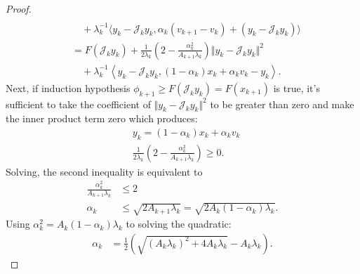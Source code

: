 \documentclass[12pt]{article}
\begin{document}
\begin{proof}
\begin{align*}
                \\
                    &\quad 
                    + 
                    \lambda_k^{-1}
                    \langle
                        y_k - \mathcal J_k y_k,
                        \alpha_k(v_{k + 1} - v_k) + (y_k - \mathcal J_k y_k)
                    \rangle
                \\
                &= 
                F(\mathcal J_k y_k)
                + 
                \frac{1}{2\lambda_k}
                \left(
                    2 - \frac{\alpha_k^2}{A_{k + 1}\lambda_k}
                \right)
                \Vert y_k - \mathcal J_ky_k\Vert^2
                \\
                    & \quad 
                    + 
                    \lambda_k^{-1}
                    \left\langle 
                        y_k - \mathcal J_k y_k, 
                        (1 - \alpha_k)x_k + \alpha_k v_k - y_k
                    \right\rangle. 
            \end{align*}
            Next, if induction hypothesis $\phi_{k + 1}\ge F(\mathcal J_k y_k) = F(x_{k + 1})$ is true, it's sufficient to take the coefficient of $\Vert y_k - \mathcal J_k y_k\Vert^2$ to be greater than zero and make the inner product term zero which produces: 
            \begin{align*}
                & 
                y_k = (1 - \alpha_k)x_k + \alpha_k v_k
                \\
                &
                \frac{1}{2\lambda_k}
                \left(
                    2 - \frac{\alpha_k^2}{A_{k + 1}\lambda_k}
                \right) 
                \ge 0.
            \end{align*}
            Solving, the second inequality is equivalent to
            \begin{align*}
                \frac{\alpha_k^2}{A_{k + 1}\lambda_k} 
                & 
                \le 2
                \\
                \alpha_k
                & 
                \le
                \sqrt{2A_{k + 1}\lambda_k}
                = \sqrt{2A_k(1 - \alpha_k)\lambda_k}. 
            \end{align*}
            Using $\alpha_k^2 = A_k(1 - \alpha_k)\lambda_k$ to solving the quadratic: 
            \begin{align*}
                \alpha_k
                &= 
                \frac{1}{2}\left(
                    \sqrt{(A_k\lambda_k)^2 + 4A_k \lambda_k}
                    - A_k\lambda_k
                \right). 
            \end{align*}
        \end{proof}
\end{document}
